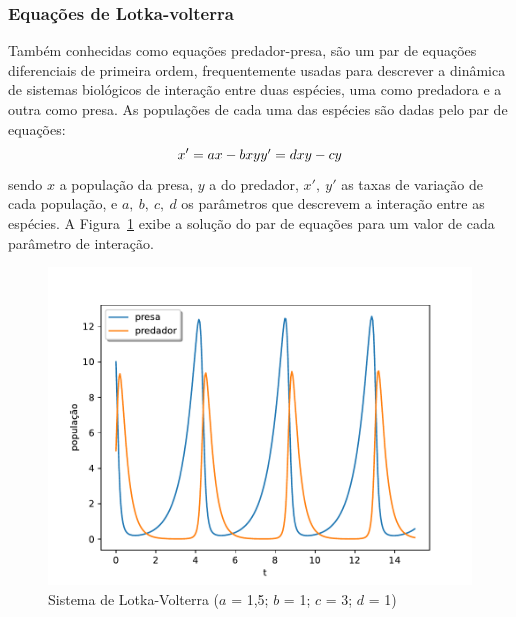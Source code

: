 \subsubsection{Equações de Lotka-volterra}
Também conhecidas como equações predador-presa, são um par de equações diferenciais de primeira ordem, frequentemente usadas para descrever a dinâmica de sistemas biológicos de interação entre duas espécies, uma como predadora e a outra como presa. As populações de cada uma das espécies são dadas pelo par de equações:
\begin{equation}\label{eq:lotka_volterra}
	x' = ax - bxy
	$$$$
	y' = dxy - cy
\end{equation}
sendo $x$ a população da presa, $y$ a do predador, $x',\ y'$ as taxas de variação de cada população, e $a,\ b,\ c,\ d$ os parâmetros que descrevem a interação entre as espécies. A Figura~\ref{fig:lotka-volterra} exibe a solução do par de equações para um valor de cada parâmetro de interação.

\begin{figure}[tb]
	\centering
	\caption{Sistema de Lotka-Volterra ($a$ = 1,5; $b$ = 1; $c$ = 3; $d$ = 1)}
	\label{fig:lotka-volterra}
	\includegraphics[width=0.6\linewidth]{figs/lotka-volterra}
\end{figure}


